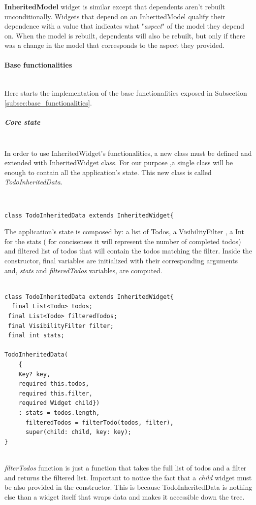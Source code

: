 \textbf{InheritedModel} widget is similar except that dependents aren't rebuilt unconditionally.
Widgets that depend on an InheritedModel qualify their dependence with a value that indicates what "\textit{aspect}" of the model they depend on. When the model is rebuilt, dependents will also be rebuilt, but only if there was a change in the model that corresponds to the aspect they provided.
\paragraph{Base functionalities} \mbox{} \\
\label{par:todo_app_inherited_widget_base_app}
Here starts the implementation of the base functionalities exposed in Subsection \ref{subsec:base_functionalities}.
\subparagraph{Core state}\mbox{}\\
\label{subpar:todo_app_inherited_widget_core_state}
In order to use InheritedWidget's functionalities, a new class must be defined and extended with InheritedWidget class. For our purpose ,a single class will be enough to contain all the application's state. This new class is called \textit{TodoInheritedData}.
\begin{code}
\mbox{}\\
 \mbox{}

\begin{verbatim}
class TodoInheritedData extends InheritedWidget{
\end{verbatim}
\mbox{}
\end{code}
The application's state is composed by: a list of Todos, a VisibilityFilter , a Int for the stats ( for conciseness it will represent the number of completed todos) and filtered list of todos that will contain the todos matching the filter. Inside the constructor, final variables are initialized with their corresponding arguments and, \textit{stats} and \textit{filteredTodos} variables, are computed. 
\mbox{}\\
\begin{code}
\mbox{}
\begin{verbatim}

class TodoInheritedData extends InheritedWidget{
  final List<Todo> todos;
 final List<Todo> filteredTodos;
 final VisibilityFilter filter;
 final int stats;
 
TodoInheritedData(
    { 
    Key? key,
    required this.todos,
    required this.filter,
    required Widget child})
    : stats = todos.length,
      filteredTodos = filterTodo(todos, filter),
      super(child: child, key: key);
}
\end{verbatim}
\end{code}
\mbox{}\\
\textit{filterTodos} function is just a function that takes the full list of todos and a filter and returns the filtered list. Important to notice  the fact that a \textit{child} widget must be also provided in the constructor. This is because TodoInheritedData is nothing else than a widget itself that wraps data and makes it accessible down the tree.

